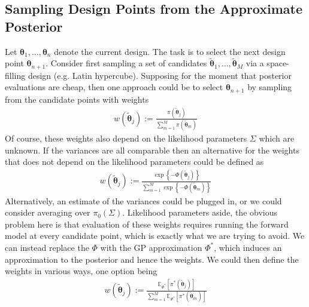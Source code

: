 \documentclass[12pt]{article}
\newcommand{\E}{\mathbb{E}}
\newcommand{\btheta}{\boldsymbol{\theta}}
\begin{document}
\subsection{Sampling Design Points from the Approximate Posterior}
Let $\btheta_1, \dots, \btheta_n$ denote the current design. The task is to select the next design point $\btheta_{n + 1}$. Consider first sampling a set of candidates 
$\tilde{\btheta}_1, \dots, \tilde{\btheta}_M$ via a space-filling design (e.g. Latin hypercube). Supposing for the moment that posterior evaluations are cheap, then one approach 
could be to select $\btheta_{n + 1}$ by sampling from the candidate points with weights 
\begin{align*}
w\left(\tilde{\btheta}_j\right) := \frac{\pi(\tilde{\btheta}_j)}{\sum_{m = 1}^{M} \pi(\tilde{\btheta}_m)}
\end{align*}
Of course, these weights also depend on the likelihood parameters $\Sigma$ which are unknown. If the variances are all comparable then an alternative for the weights that 
does not depend on the likelihood parameters could be defined as 
\begin{align*}
w\left(\tilde{\btheta}_j\right) := \frac{\exp\left\{-\Phi(\tilde{\btheta}_j)\right\}}{\sum_{m = 1}^{M} \exp\left\{-\Phi(\tilde{\btheta}_m)\right\}}
\end{align*}
Alternatively, an estimate of the variances could be plugged in, or we could consider averaging over $\pi_0(\Sigma)$. Likelihood parameters aside, the obvious problem here is that 
evaluation of these weights requires running the forward model at every candidate point, which is exactly what we are trying to avoid. We can instead replace the $\Phi$ with 
the GP approximation $\Phi^*$, which induces an approximation to the posterior and hence the weights. We could then define the weights in various ways, one option being
\begin{align*}
w\left(\tilde{\btheta}_j\right) := \frac{\E_{\Phi^*} \left[\pi^*(\tilde{\btheta}_j)\right]}{\sum_{m = 1}^{M} \E_{\Phi^*} \left[\pi^*(\tilde{\btheta}_m)\right]}
\end{align*}
\end{document}
